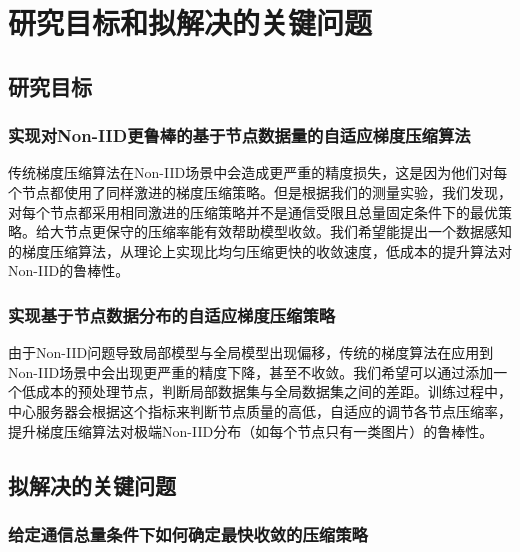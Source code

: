 
\chapter{研究目标和拟解决的关键问题}

\section{研究目标}

\subsection{实现对Non-IID更鲁棒的基于节点数据量的自适应梯度压缩算法}

传统梯度压缩算法在Non-IID场景中会造成更严重的精度损失，这是因为他们对每个节点都使用了同样激进的梯度压缩策略。但是根据我们的测量实验，我们发现，对每个节点都采用相同激进的压缩策略并不是通信受限且总量固定条件下的最优策略。给大节点更保守的压缩率能有效帮助模型收敛。我们希望能提出一个数据感知的梯度压缩算法，从理论上实现比均匀压缩更快的收敛速度，低成本的提升算法对Non-IID的鲁棒性。

\subsection{实现基于节点数据分布的自适应梯度压缩策略}

由于Non-IID问题导致局部模型与全局模型出现偏移，传统的梯度算法在应用到Non-IID场景中会出现更严重的精度下降，甚至不收敛。我们希望可以通过添加一个低成本的预处理节点，判断局部数据集与全局数据集之间的差距。训练过程中，中心服务器会根据这个指标来判断节点质量的高低，自适应的调节各节点压缩率，提升梯度压缩算法对极端Non-IID分布（如每个节点只有一类图片）的鲁棒性。

\section{拟解决的关键问题}

\subsection{给定通信总量条件下如何确定最快收敛的压缩策略}

